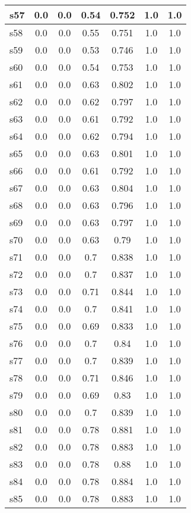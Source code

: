 \documentclass{article}
\begin{document}
\begin{tabular}{|l|c|c|c|c|c|c|}
\hline
s57 &0.0 & 0.0 & 0.54 & 0.752 & 1.0 & 1.0\\
\hline
s58 &0.0 & 0.0 & 0.55 & 0.751 & 1.0 & 1.0\\
\hline
s59 &0.0 & 0.0 & 0.53 & 0.746 & 1.0 & 1.0\\
\hline
s60 &0.0 & 0.0 & 0.54 & 0.753 & 1.0 & 1.0\\
\hline
s61 &0.0 & 0.0 & 0.63 & 0.802 & 1.0 & 1.0\\
\hline
s62 &0.0 & 0.0 & 0.62 & 0.797 & 1.0 & 1.0\\
\hline
s63 &0.0 & 0.0 & 0.61 & 0.792 & 1.0 & 1.0\\
\hline
s64 &0.0 & 0.0 & 0.62 & 0.794 & 1.0 & 1.0\\
\hline
s65 &0.0 & 0.0 & 0.63 & 0.801 & 1.0 & 1.0\\
\hline
s66 &0.0 & 0.0 & 0.61 & 0.792 & 1.0 & 1.0\\
\hline
s67 &0.0 & 0.0 & 0.63 & 0.804 & 1.0 & 1.0\\
\hline
s68 &0.0 & 0.0 & 0.63 & 0.796 & 1.0 & 1.0\\
\hline
s69 &0.0 & 0.0 & 0.63 & 0.797 & 1.0 & 1.0\\
\hline
s70 &0.0 & 0.0 & 0.63 & 0.79 & 1.0 & 1.0\\
\hline
s71 &0.0 & 0.0 & 0.7 & 0.838 & 1.0 & 1.0\\
\hline
s72 &0.0 & 0.0 & 0.7 & 0.837 & 1.0 & 1.0\\
\hline
s73 &0.0 & 0.0 & 0.71 & 0.844 & 1.0 & 1.0\\
\hline
s74 &0.0 & 0.0 & 0.7 & 0.841 & 1.0 & 1.0\\
\hline
s75 &0.0 & 0.0 & 0.69 & 0.833 & 1.0 & 1.0\\
\hline
s76 &0.0 & 0.0 & 0.7 & 0.84 & 1.0 & 1.0\\
\hline
s77 &0.0 & 0.0 & 0.7 & 0.839 & 1.0 & 1.0\\
\hline
s78 &0.0 & 0.0 & 0.71 & 0.846 & 1.0 & 1.0\\
\hline
s79 &0.0 & 0.0 & 0.69 & 0.83 & 1.0 & 1.0\\
\hline
s80 &0.0 & 0.0 & 0.7 & 0.839 & 1.0 & 1.0\\
\hline
s81 &0.0 & 0.0 & 0.78 & 0.881 & 1.0 & 1.0\\
\hline
s82 &0.0 & 0.0 & 0.78 & 0.883 & 1.0 & 1.0\\
\hline
s83 &0.0 & 0.0 & 0.78 & 0.88 & 1.0 & 1.0\\
\hline
s84 &0.0 & 0.0 & 0.78 & 0.884 & 1.0 & 1.0\\
\hline
s85 &0.0 & 0.0 & 0.78 & 0.883 & 1.0 & 1.0\\

\end{tabular}
\end{document}
